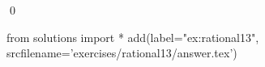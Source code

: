 
\begin{ex} 
  \label{ex:rational13}
  
  \qed
\end{ex} 
\begin{python0}
from solutions import *
add(label="ex:rational13",
    srcfilename='exercises/rational13/answer.tex') 
\end{python0}
